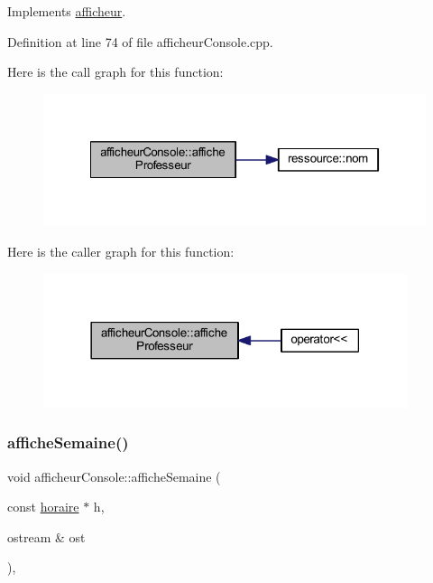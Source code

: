 Implements \hyperlink{classafficheur_a54b3e457d56738ed20641e5546872142}{afficheur}.



Definition at line 74 of file afficheur\+Console.\+cpp.

Here is the call graph for this function\+:\nopagebreak
\begin{figure}[H]
\begin{center}
\leavevmode
\includegraphics[width=322pt]{classafficheur_console_aa178d74ab314df687800c612a3615ed6_cgraph}
\end{center}
\end{figure}
Here is the caller graph for this function\+:\nopagebreak
\begin{figure}[H]
\begin{center}
\leavevmode
\includegraphics[width=302pt]{classafficheur_console_aa178d74ab314df687800c612a3615ed6_icgraph}
\end{center}
\end{figure}
\hypertarget{classafficheur_console_a0930128cabb9b2585db0140f7614a3df}{}\label{classafficheur_console_a0930128cabb9b2585db0140f7614a3df} 
\subsubsection{\texorpdfstring{affiche\+Semaine()}{afficheSemaine()}}
{\footnotesize\ttfamily void afficheur\+Console\+::affiche\+Semaine (\begin{DoxyParamCaption}\item[{const \hyperlink{classhoraire}{horaire} $\ast$}]{h,  }\item[{ostream \&}]{ost }\end{DoxyParamCaption})\hspace{0.3cm}{\ttfamily [override]}, {\ttfamily [virtual]}}



